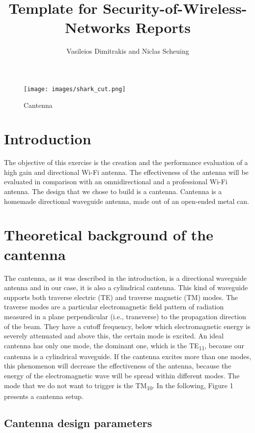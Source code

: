 \documentclass[12pt,a4paper]{article}
\title{Template for Security-of-Wireless-Networks Reports}
\author{Vasileios Dimitrakis and Niclas Scheuing}
\begin{document}
\maketitle
\begin{figure}[h]
	\texttt{[image: images/shark\_cut.png]}
	\caption{Cantenna}
	\label{shark}
\end{figure}
\pagebreak
\section{Introduction}
	The objective of this exercise is the creation and the performance evaluation of a high gain
	and directional Wi-Fi antenna. The effectiveness of the antenna will be evaluated in comparison with an omnidirectional and a professional Wi-Fi antenna. The design that we chose to build is a cantenna. Cantenna is a homemade directional waveguide antenna, made out of an open-ended metal can.

\section{Theoretical background of the cantenna}
	The cantenna, as it was described in the introduction, is a directional waveguide antenna and in our case, it is also a cylindrical cantenna. This kind of waveguide supports both traverse electric (TE) and traverse magnetic (TM) modes. The traverse modes are a particular electromagnetic field pattern of radiation measured in a plane perpendicular (i.e., transverse) to the propagation direction of the beam. They have a cutoff frequency, below which electromagnetic energy is severely attenuated and above this, the certain mode is excited. An ideal cantenna has only one mode, the dominant one, which is the TE\textsubscript{11}, because our cantenna is a cylindrical waveguide. If the cantenna excites more than one modes, this phenomenon will decrease the effectiveness of the antenna, because the energy of the electromagnetic wave will be spread within different modes. The mode that we do not want to trigger is the TM\textsubscript{10}. In the following, Figure 1 presents a cantenna setup.
	
	
	\subsection{Cantenna design parameters}
		
\end{document}
